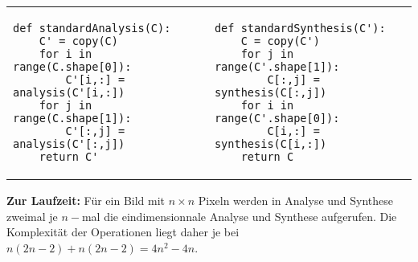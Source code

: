 \begin{adjustbox}{max width=\textwidth ,center}
\begin{tabular}{p{}|p{}}
\begin{verbatim}
def standardAnalysis(C):
    C' = copy(C)
    for i in range(C.shape[0]):
        C'[i,:] = analysis(C'[i,:])
    for j in range(C.shape[1]):
        C'[:,j] = analysis(C'[:,j])
    return C'
\end{verbatim}
&
\begin{verbatim}
def standardSynthesis(C'):
    C = copy(C')
    for j in range(C'.shape[1]):
        C[:,j] = synthesis(C[:,j])
    for i in range(C'.shape[0]):
        C[i,:] = synthesis(C[i,:])
    return C
\end{verbatim}
\\
\end{tabular}
\end{adjustbox}

\noindent \textbf{Zur Laufzeit:} Für ein Bild mit $n \times n$ Pixeln werden in Analyse und Synthese zweimal je $n-$mal die eindimensionnale Analyse und Synthese aufgerufen. Die Komplexität der Operationen liegt daher je bei $n(2n-2) + n(2n-2) = 4n^2-4n$.

